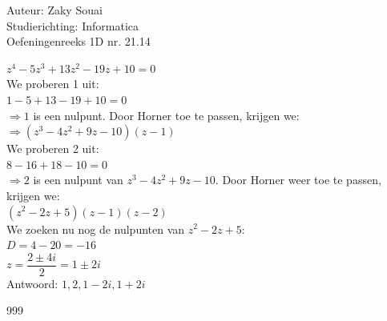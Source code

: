 \documentclass[a4paper]{article}
\begin{document}
  
\noindent \large Auteur: Zaky Souai \\
\noindent \large Studierichting:  Informatica\\
\noindent \large Oefeningenreeks 1D nr. 21.14\\

\bigskip

\normalsize

$z^4 - 5z^3 + 13z^2 - 19z + 10 = 0$\\

We proberen 1 uit:\\

$1 - 5 + 13 - 19 + 10 = 0 $\\

$\Rightarrow 1 $ is een nulpunt. Door Horner toe te passen, krijgen we: \\

$\Rightarrow (z^3 - 4z^2 + 9z - 10)(z-1)$\\

We proberen 2 uit:\\

$8 - 16 + 18 - 10 = 0$\\

$\Rightarrow 2$ is een nulpunt van $z^3 - 4z^2 + 9z - 10$. Door Horner weer toe te passen, krijgen we: \\

$(z^2 - 2z + 5)(z-1)(z-2)$\\

We zoeken nu nog de nulpunten van $z^2 - 2z + 5$:\\

$D = 4 - 20 = -16$\\

$z = \dfrac{2\pm{4i}}{2} = 1 \pm{2i}$\\

Antwoord: $1,2,1-2i,1+2i$\\


\begin{thebibliography}{999}
\end{thebibliography}
\end{document}
